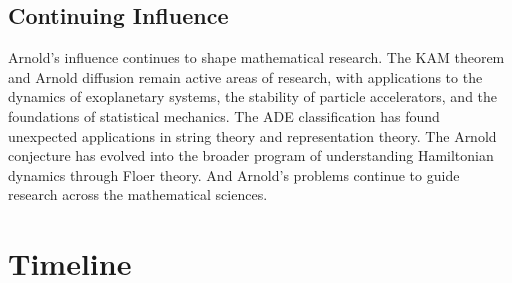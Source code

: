 \subsection{Continuing Influence}

Arnold's influence continues to shape mathematical research. The KAM theorem and Arnold diffusion remain active areas of research, with applications to the dynamics of exoplanetary systems, the stability of particle accelerators, and the foundations of statistical mechanics. The ADE classification has found unexpected applications in string theory and representation theory. The Arnold conjecture has evolved into the broader program of understanding Hamiltonian dynamics through Floer theory. And Arnold's problems continue to guide research across the mathematical sciences.

\section*{Timeline}
